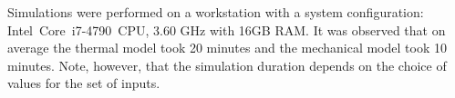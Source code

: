 Simulations were performed on a workstation with a system configuration: Intel~Core~i7-4790~CPU, 
3.60 GHz with 16GB RAM. It was observed that on average the thermal model took 20 minutes and the
mechanical model took 10 minutes. Note, however, that the simulation duration depends on the choice of
values for the set of inputs.  


























